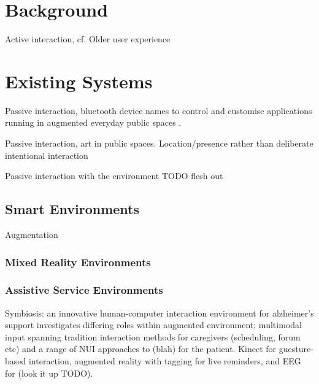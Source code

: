 \documentclass[oribibl]{llncs}
\begin{document}
\section{Background}

Active interaction, cf. Older user experience

\section{Existing Systems}	\label{sec:existing_systems}

Passive interaction, bluetooth device names to control and customise applications running in augmented everyday public spaces \cite{Davies:2009:UBD:1555816.1555832}.

Passive interaction, art in public spaces. Location/presence rather than deliberate intentional interaction \cite{Nguyen:2006:MSV:1180639.1180732}

Passive interaction with the environment TODO flesh out \cite{Vazquez:2004:IMP:1031419.1031437}

\subsection{Smart Environments}		\label{sub:smart_environments}
Augmentation

\subsubsection{Mixed Reality Environments}		\label{ssub:mixed_reality_environments}

\subsubsection{Assistive Service Environments}		\label{ssub:assistive_service_environments}

Symbiosis: an innovative human-computer interaction environment for alzheimer's support \cite{Mandiliotis:2013:SIH:2526481.2526496} investigates differing roles within augmented environment; multimodal input spanning tradition interaction methods for caregivers (scheduling, forum etc) and a range of NUI approaches to (blah) for the patient. Kinect for guesture-based interaction, augmented reality with tagging for live reminders, and EEG for (look it up TODO).
\end{document}
